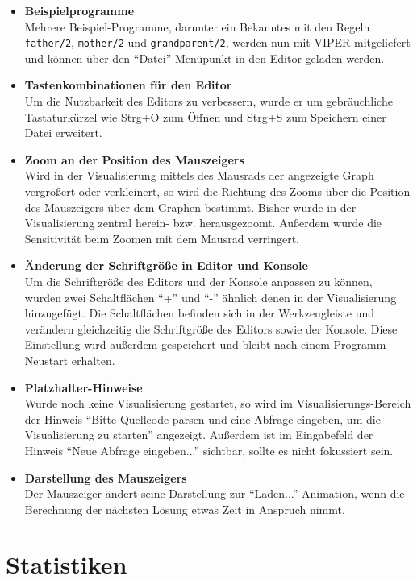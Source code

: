 \documentclass[parskip=full,11pt,twoside]{scrartcl}
\begin{document}
\begin{itemize}
  \item \textbf{Beispielprogramme}\\
        Mehrere Beispiel-Programme, darunter ein Bekanntes mit den Regeln \texttt{father/2}, \texttt{mother/2} und \texttt{grandparent/2}, werden nun mit VIPER mitgeliefert und können über den \enquote{Datei}-Menüpunkt in den Editor geladen werden.
  \item \textbf{Tastenkombinationen für den Editor}\\
        Um die Nutzbarkeit des Editors zu verbessern, wurde er um gebräuchliche Tastaturkürzel wie Strg+O zum Öffnen und Strg+S zum Speichern einer Datei erweitert.
  \item \textbf{Zoom an der Position des Mauszeigers}\\
        Wird in der Visualisierung mittels des Mausrads der angezeigte Graph vergrößert oder verkleinert, so wird die Richtung des Zooms über die Position des Mauszeigers über dem Graphen bestimmt. Bisher wurde in der Visualisierung zentral herein- bzw. herausgezoomt. Außerdem wurde die Sensitivität beim Zoomen mit dem Mausrad verringert.
  \item \textbf{Änderung der Schriftgröße in Editor und Konsole}\\
        Um die Schriftgröße des Editors und der Konsole anpassen zu können, wurden zwei Schaltflächen \enquote{+} und \enquote{-} ähnlich denen in der Visualisierung hinzugefügt. Die Schaltflächen befinden sich in der Werkzeugleiste und verändern gleichzeitig die Schriftgröße des Editors sowie der Konsole. Diese Einstellung wird außerdem gespeichert und bleibt nach einem Programm-Neustart erhalten.
  \item \textbf{Platzhalter-Hinweise}\\
        Wurde noch keine Visualisierung gestartet, so wird im Visualisierungs-Bereich der Hinweis \enquote{Bitte Quellcode parsen und eine Abfrage eingeben, um die Visualisierung zu starten} angezeigt. Außerdem ist im Eingabefeld der Hinweis \enquote{Neue Abfrage eingeben...} sichtbar, sollte es nicht fokussiert sein.
  \item \textbf{Darstellung des Mauszeigers}\\
        Der Mauszeiger ändert seine Darstellung zur \enquote{Laden...}-Animation, wenn die Berechnung der nächsten Lösung etwas Zeit in Anspruch nimmt.
\end{itemize}

\section{Statistiken}

\end{document}
